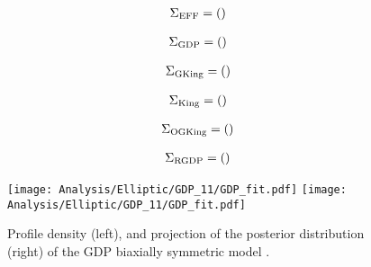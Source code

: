 {\tiny
\begin{multline}
\Sigma_{\rm{EFF}}=
\left(
\arraycolsep=1.5pt
\begin{array}{*{10}r}

\end{array}\right) \nonumber
\end{multline}

\begin{multline}
\Sigma_{\rm{GDP}}=
\left(
\arraycolsep=1.5pt
\begin{array}{*{10}r}

\end{array}\right) \nonumber
\end{multline}

\begin{multline}
\Sigma_{\rm{GKing}}=
\left(
\arraycolsep=1.5pt
\begin{array}{*{10}r}

\end{array}\right) \nonumber
\end{multline}


\begin{multline}
\Sigma_{\rm{King}}=
\left(
\arraycolsep=1.5pt
\begin{array}{*{10}r}

\end{array}\right) \nonumber
\end{multline}


\begin{multline}
\Sigma_{\rm{OGKing}}=
\left(
\arraycolsep=1.5pt
\begin{array}{*{10}r}

\end{array}\right)\nonumber
\end{multline}

\begin{multline}
\Sigma_{\rm{RGDP}}=
\left(
\arraycolsep=1.5pt
\begin{array}{*{10}r}

\end{array}\right)\nonumber
\end{multline}
}
   
\begin {figure}
 \centering
 \texttt{[image: Analysis/Elliptic/GDP\_11/GDP\_fit.pdf]}
 \texttt{[image: Analysis/Elliptic/GDP\_11/GDP\_fit.pdf]}
  \caption{Profile density (left), and projection of the posterior distribution (right) of the GDP biaxially symmetric model .}
\label{fig:GDP7Ell}
\end {figure}

